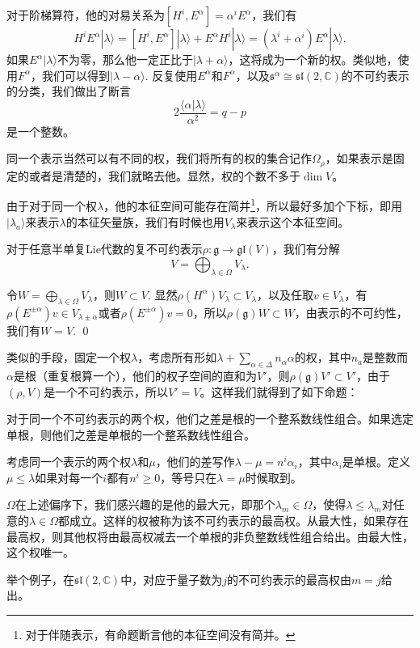 \documentclass[10pt]{article}
\newcommand{\cc}{\mathbb{C}}
\newcommand{\lag}{{\mathfrak{g}}}
\begin{document}
对于阶梯算符，他的对易关系为$[H^i,E^\alpha]=\alpha^iE^\alpha$，我们有
\[
	H^iE^\alpha|\lambda\rangle=[H^i,E^\alpha]|\lambda\rangle+E^\alpha H^i|\lambda\rangle=(\lambda^i+\alpha^i)E^\alpha |\lambda\rangle.
\]
如果$E^\alpha |\lambda\rangle$不为零，那么他一定正比于$|\lambda+\alpha\rangle$，这将成为一个新的权。类似地，使用$F^\alpha$，我们可以得到$|\lambda-\alpha\rangle$. 反复使用$E^\alpha$和$F^\alpha$，以及$\mathfrak{s}^\alpha\cong \mathfrak{sl}(2,\cc)$的不可约表示的分类，我们做出了断言
\[
	2\frac{\langle\alpha|\lambda\rangle}{\alpha^2}=q-p
\]
是一个整数。

同一个表示当然可以有不同的权，我们将所有的权的集合记作$\Omega_\rho$，如果表示是固定的或者是清楚的，我们就略去他。显然，权的个数不多于$\dim V$。

\para 由于对于同一个权$\lambda$，他的本征空间可能存在简并\footnote{对于伴随表示，有命题断言他的本征空间没有简并。}，所以最好多加个下标，即用$|\lambda_a\rangle$来表示$\lambda$的本征矢量族，我们有时候也用$V_{\lambda}$来表示这个本征空间。

\pro 对于任意半单复Lie代数的复不可约表示$\rho:\lag\to \mathfrak{gl}(V)$，我们有分解
\[
	V=\bigoplus_{\lambda\in\Omega} V_\lambda.
\]

\proof 令$W=\bigoplus_{\lambda\in\Omega} V_\lambda$，则$W\subset V$. 显然$\rho(H^\alpha)V_\lambda\subset V_\lambda$，以及任取$v\in V_\lambda$，有$\rho(E^{\pm\alpha})v \in V_{\lambda\pm\alpha}$或者$\rho(E^{\pm\alpha})v=0$，所以$\rho(\lag)W\subset W$，由表示的不可约性，我们有$W=V$. \qed

类似的手段，固定一个权$\lambda$，考虑所有形如$\lambda+\sum_{\alpha\in\Delta} n_\alpha\alpha$的权，其中$n_a$是整数而$\alpha$是根（重复根算一个），他们的权子空间的直和为$V'$，则$\rho(\lag)V'\subset V'$，由于$(\rho,V)$是一个不可约表示，所以$V'=V$。这样我们就得到了如下命题：

\pro 对于同一个不可约表示的两个权，他们之差是根的一个整系数线性组合。如果选定单根，则他们之差是单根的一个整系数线性组合。

\para 考虑同一个表示的两个权$\lambda$和$\mu$，他们的差写作$\lambda-\mu=n^i \alpha_i$，其中$\alpha_i$是单根。定义$\mu \leq \lambda$如果对每一个$i$都有$n^i\geq 0$，等号只在$\lambda=\mu$时候取到。

$\Omega$在上述偏序下，我们感兴趣的是他的最大元，即那个$\lambda_m\in \Omega$，使得$\lambda\leq \lambda_m$对任意的$\lambda\in \Omega$都成立。这样的权被称为该不可约表示的最高权。从最大性，如果存在最高权，则其他权将由最高权减去一个单根的非负整数线性组合给出。由最大性，这个权唯一。

举个例子，在$\mathfrak{sl}(2,\cc)$中，对应于量子数为$j$的不可约表示的最高权由$m=j$给出。
\end{document}

